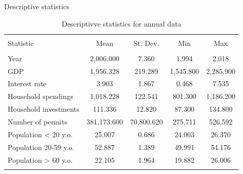 \documentclass[11pt,ignorenonframetext,]{beamer}
\begin{document}
\begin{frame}{Descriptive statistics}
\protect\hypertarget{descriptive-statistics}{}

\FloatBarrier

\tiny

\begin{table}[!htbp] \centering 
\begin{tabular}{@{\extracolsep{5pt}}lcccc} 
\\[-1.8ex]\hline 
\hline \\[-1.8ex] 
Statistic & \multicolumn{1}{c}{Mean} & \multicolumn{1}{c}{St. Dev.} & \multicolumn{1}{c}{Min} & \multicolumn{1}{c}{Max} \\ 
\hline \\[-1.8ex] 
Year & 2,006.000 & 7.360 & 1,994 & 2,018 \\ 
GDP & 1,956.328 & 219.289 & 1,545.800 & 2,285.900 \\ 
Interest rate & 3.903 & 1.867 & 0.468 & 7.535 \\ 
Household spendings & 1,018.228 & 122.541 & 801.300 & 1,186.200 \\ 
Household investments & 111.336 & 12.820 & 87.300 & 134.800 \\ 
Number of permits & 381,173.600 & 70,800.620 & 275,711 & 526,592 \\ 
Population < 20 y.o. & 25.007 & 0.686 & 24.003 & 26.370 \\ 
Population 20-59 y.o. & 52.887 & 1.389 & 49.991 & 54.176 \\ 
Population > 60 y.o. & 22.105 & 1.964 & 19.882 & 26.006 \\ 
\hline \\[-1.8ex] 
\end{tabular} 
  \caption{Descriptivve statistics for annual data} 
  \label{} 
\end{table}

\normalsize

\FloatBarrier

\end{frame}
\end{document}
